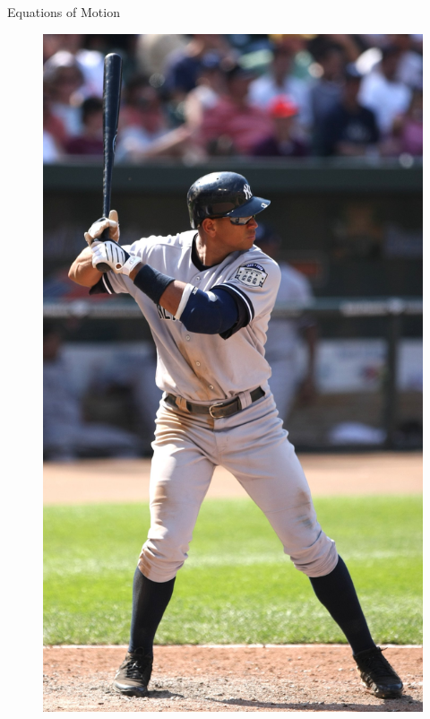 \documentclass[tikz]{beamer}
\begin{document}
\begin{frame} {Equations of Motion}
	\only<5> {
		\begin{figure}
			\centering
			\includegraphics[scale=0.075]{arod.jpg}
		\end{figure}
	}



\end{frame}
\end{document}
